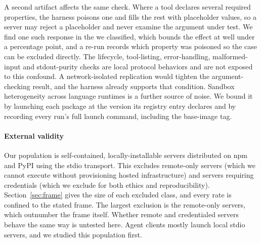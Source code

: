 A second artifact affects the same check. Where a tool declares several required
properties, the harness poisons one and fills the rest with placeholder values, so a
server may reject a placeholder and never examine the argument under test. We find
one such response in the \NAcceptInvalid{} we classified, which bounds the effect at
well under a percentage point, and a re-run records which property was poisoned so
the case can be excluded directly. The lifecycle, tool-listing, error-handling, malformed-input and
stdout-purity checks are local protocol behaviors and are not exposed to this
confound. A network-isolated replication would tighten the argument-checking result,
and the harness already supports that condition. Sandbox heterogeneity across
language runtimes is a further source of noise. We bound it by launching each package
at the version its registry entry declares and by recording every run's full launch
command, including the base-image tag.

\paragraph{External validity}
Our population is self-contained, locally-installable servers distributed on npm and
PyPI using the stdio transport. This excludes remote-only servers (which we cannot
execute without provisioning hosted infrastructure) and servers requiring
credentials (which we exclude for both ethics and reproducibility). Section~\ref{sec:frame} gives the size of each excluded class, and every
rate is confined to the stated frame. The largest exclusion is the \NFunnelRemote{}
remote-only servers, which outnumber the frame itself.
Whether remote and credentialed servers behave the same way is untested here. Agent
clients mostly launch local stdio servers, and we studied this population first.

